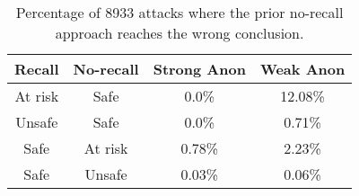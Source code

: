 
\begin{table}[t]
\begin{center}
\begin{small}
\begin{tabular}{cc|cc}
\toprule
 Recall & No-recall  & Strong Anon & Weak Anon \\
\midrule
At risk & Safe & 0.0\% & 12.08\% \\
Unsafe & Safe & 0.0\% & 0.71\% \\
Safe & At risk & 0.78\% & 2.23\% \\
Safe & Unsafe & 0.03\% & 0.06\% \\
\bottomrule
\end{tabular}
\caption{Percentage of 8933 attacks where the prior no-recall approach reaches the wrong conclusion.}
\label{tab:wrong_conclusion}
\end{small}
\end{center}
\end{table}
